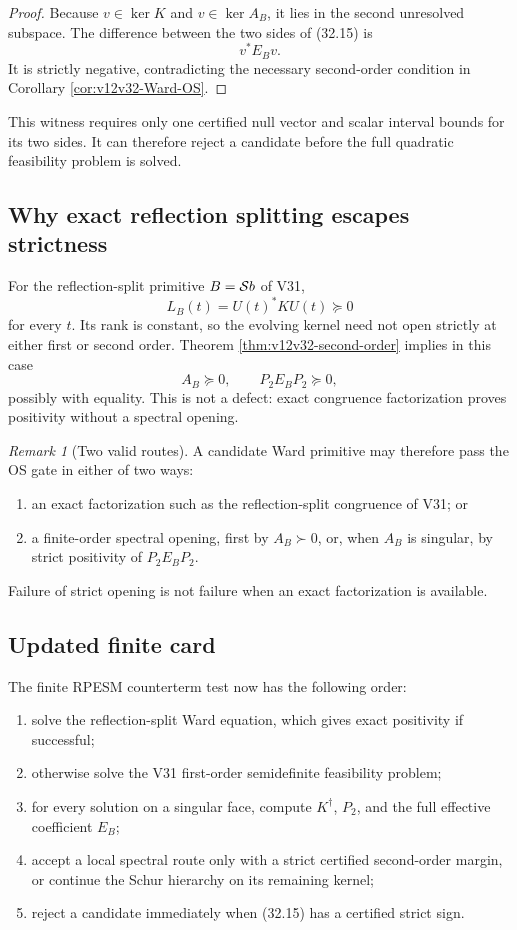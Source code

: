 \documentclass[11pt]{article}
\theoremstyle{remark}
\newtheorem{remark}[theorem]{Remark}
\begin{document}
\begin{proof}
Because \(v\in\ker K\) and \(v\in\ker A_B\), it lies in the
second unresolved subspace.  The difference between the two sides
of (32.15) is
\[
 v^*E_Bv.
\]
It is strictly negative, contradicting the necessary second-order
condition in Corollary \ref{cor:v12v32-Ward-OS}.
\end{proof}

This witness requires only one certified null vector and scalar
interval bounds for its two sides.  It can therefore reject a
candidate before the full quadratic feasibility problem is solved.

\subsection{Why exact reflection splitting escapes strictness}

For the reflection-split primitive \(B={\cal S}b\) of V31,
\[
 L_B(t)=U(t)^*KU(t)\succeq0
\]
for every \(t\).  Its rank is constant, so the evolving kernel need
not open strictly at either first or second order.  Theorem
\ref{thm:v12v32-second-order} implies in this case
\[
 A_B\succeq0,\qquad P_2E_BP_2\succeq0,
\]
possibly with equality.  This is not a defect: exact congruence
factorization proves positivity without a spectral opening.

\begin{remark}[Two valid routes]
\label{rem:v12v32-two-routes}
A candidate Ward primitive may therefore pass the OS gate in either
of two ways:
\begin{enumerate}
\item an exact factorization such as the reflection-split congruence
of V31; or
\item a finite-order spectral opening, first by \(A_B\succ0\), or,
when \(A_B\) is singular, by strict positivity of \(P_2E_BP_2\).
\end{enumerate}
Failure of strict opening is not failure when an exact factorization
is available.
\end{remark}

\subsection{Updated finite card}

The finite RPESM counterterm test now has the following order:

\begin{enumerate}
\item solve the reflection-split Ward equation, which gives exact
positivity if successful;
\item otherwise solve the V31 first-order semidefinite feasibility
problem;
\item for every solution on a singular face, compute \(K^\dagger\),
\(P_2\), and the full effective coefficient \(E_B\);
\item accept a local spectral route only with a strict certified
second-order margin, or continue the Schur hierarchy on its remaining
kernel;
\item reject a candidate immediately when (32.15) has a certified
strict sign.
\end{enumerate}
\end{document}
